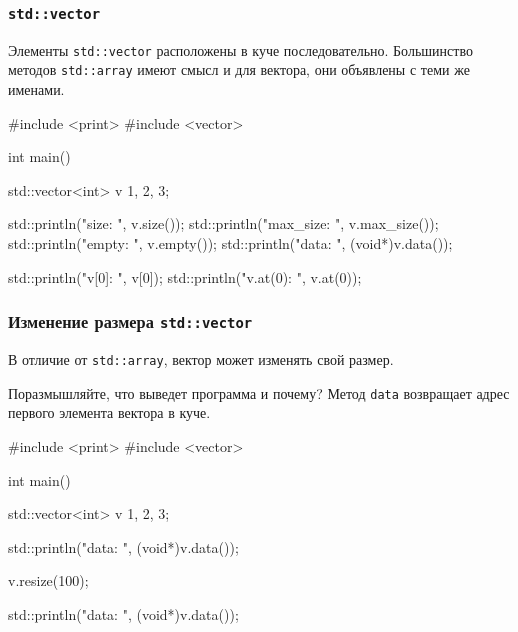 \documentclass[compress, 8pt]{beamer}
\begin{document}
  \begin{frame}[fragile]

    \frametitle{\texttt{std::vector}}

    Элементы \texttt{std::vector}\footnotemark{} расположены в куче последовательно.
    Большинство методов \texttt{std::array} имеют смысл и для вектора,
    они объявлены с теми же именами.


    \begin{mycppinplacelisting}
#include <print>
#include <vector>

int main() {
    std::vector<int> v {1, 2, 3};

    std::println("size: {}", v.size());
    std::println("max_size: {}", v.max_size());
    std::println("empty: {}", v.empty());
    std::println("data: {}", (void*){v.data()});

    std::println("v[0]: {}", v[0]);
    std::println("v.at(0): {}", v.at(0));
}
    \end{mycppinplacelisting}

  \end{frame}

  \begin{frame}[fragile]

    \frametitle{Изменение размера \texttt{std::vector}}

    В отличие от \texttt{std::array}, вектор может изменять
    свой размер.

    \begin{task}
      Поразмышляйте, что выведет программа и почему?
      Метод \texttt{data} возвращает адрес первого элемента
      вектора в куче.
    \end{task}

    \begin{mycppinplacelisting}
#include <print>
#include <vector>

int main() {
    std::vector<int> v {1, 2, 3};

    std::println("data: {}", (void*){v.data()});

    v.resize(100);

    std::println("data: {}", (void*){v.data()});
}
    \end{mycppinplacelisting}

  \end{frame}
\end{document}
